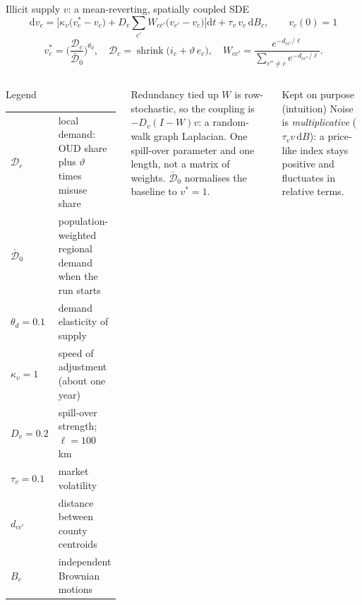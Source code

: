 ﻿\documentclass[9pt,aspectratio=169]{beamer}
\newenvironment{tied}{\begin{alertblock}{Redundancy tied up}\small}{\end{alertblock}}
\newenvironment{kept}{\begin{exampleblock}{Kept on purpose (intuition)}\small}{\end{exampleblock}}
\newenvironment{legend}{\begin{block}{Legend}\scriptsize}{\end{block}}
\newcommand{\dd}{\mathrm d}
\begin{document}
\begin{frame}{Illicit supply $v$: a mean-reverting, spatially coupled SDE}
 \[
  \dd v_c=\Big[\kappa_v\big(v^\ast_c-v_c\big)+D_v\sum_{c'}W_{cc'}\big(v_{c'}-v_c\big)\Big]\dd t+\tau_v\,v_c\,\dd B_c,
  \qquad v_c(0)=1
 \]
 \[
  v^\ast_c=\Big(\frac{\mathcal D_c}{\bar{\mathcal D}_0}\Big)^{\theta_d},\quad
  \mathcal D_c=\operatorname{shrink}\!\big(i_c+\vartheta\,e_c\big),\quad
  W_{cc'}=\frac{e^{-d_{cc'}/\ell}}{\sum_{c''\ne c}e^{-d_{cc''}/\ell}}.
 \]
 \begin{columns}[T]
 \begin{legend}
 \begin{tabular}{@{}p{1.2cm}p{5.6cm}@{}}
 $\mathcal D_c$ & local demand: OUD share plus $\vartheta$ times misuse share\\
 $\bar{\mathcal D}_0$ & population-weighted regional demand when the run starts\\
 $\theta_d=0.1$ & demand elasticity of supply\\
 $\kappa_v=1$ & speed of adjustment (about one year)\\
 $D_v=0.2$ & spill-over strength; $\ell=100$ km\\
 $\tau_v=0.1$ & market volatility\\
 $d_{cc'}$ & distance between county centroids\\
 $B_c$ & independent Brownian motions
 \end{tabular}
 \end{legend}
 \begin{tied}
  $W$ is row-stochastic, so the coupling is $-D_v(I-W)v$: a random-walk graph Laplacian. One spill-over parameter and one length, not a matrix of weights. $\bar{\mathcal D}_0$ normalises the baseline to $v^\ast=1$.
 \end{tied}
 \begin{kept}
  Noise is \emph{multiplicative} ($\tau_v v\,\dd B$): a price-like index stays positive and fluctuates in relative terms.
 \end{kept}
 \end{columns}
\end{frame}
\end{document}

